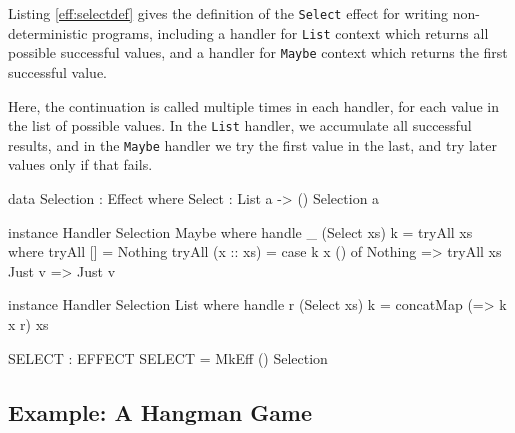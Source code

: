 Listing \ref{eff:selectdef} gives the definition of the \texttt{Select} effect
for writing non-deterministic programs, including a handler for \texttt{List}
context which returns all possible successful values, and a handler for
\texttt{Maybe} context which returns the first successful value.

Here, the continuation is called multiple times in each handler, for each
value in the list of possible values. In the \texttt{List} handler, we
accumulate all successful results, and in the \texttt{Maybe} handler we
try the first value in the last, and try later values only if that fails.

\begin{code}[float=h,frame=single, caption={Non-determinism Effect Definition}, label=eff:selectdef]
data Selection : Effect where
     Select : List a -> { () } Selection a 

instance Handler Selection Maybe where
     handle _ (Select xs) k = tryAll xs where
         tryAll [] = Nothing
         tryAll (x :: xs) = case k x () of
                                 Nothing => tryAll xs
                                 Just v => Just v

instance Handler Selection List where
     handle r (Select xs) k = concatMap (\x => k x r) xs

SELECT : EFFECT
SELECT = MkEff () Selection
\end{code}

\subsection{Example: A Hangman Game}

